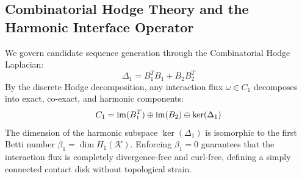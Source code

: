 \subsection{Combinatorial Hodge Theory and the Harmonic Interface Operator}
We govern candidate sequence generation through the Combinatorial Hodge Laplacian:
\begin{equation}
    \Delta_1 = B_1^T B_1 + B_2 B_2^T
\end{equation}
By the discrete Hodge decomposition, any interaction flux $\omega \in C_1$ decomposes into exact, co-exact, and harmonic components:
\begin{equation}
    C_1 = \operatorname{im}(B_1^T) \oplus \operatorname{im}(B_2) \oplus \ker(\Delta_1)
\end{equation}
The dimension of the harmonic subspace $\ker(\Delta_1)$ is isomorphic to the first Betti number $\beta_1 = \dim H_1(\mathcal{K})$. Enforcing $\beta_1 = 0$ guarantees that the interaction flux is completely divergence-free and curl-free, defining a simply connected contact disk without topological strain.

